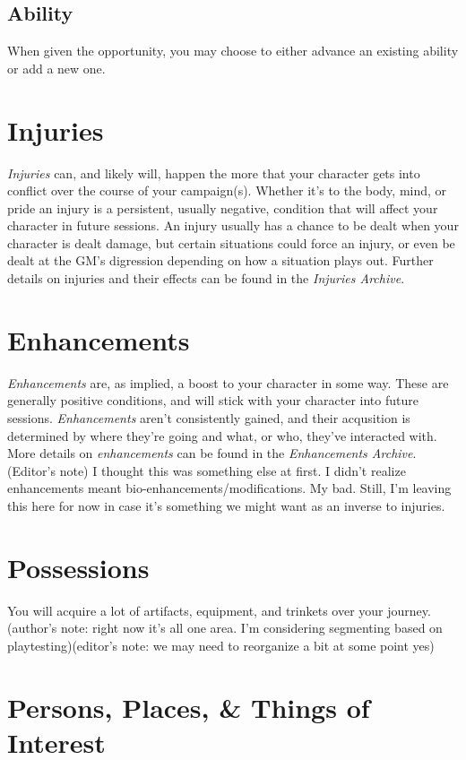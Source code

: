 \subsection{Ability \advancement}\label{subsec:adv_ability}
When given the opportunity, you may choose to either advance an existing ability or add a new one.

\section{Injuries}\label{sec:adv_injuries}
\emph{Injuries} can, and likely will, happen the more that your character gets into conflict over the course of your campaign(s). Whether it's to the body, mind, or pride an injury is a persistent, usually negative, condition that will affect your character in future sessions. An injury usually has a chance to be dealt when your character is dealt \emph{\HPful} damage, but certain situations could force an injury, or even be dealt at the GM's digression depending on how a situation plays out. Further details on injuries and their effects can be found in the \emph{Injuries Archive}.

\section{Enhancements}\label{sec:adv_enhancements}
\emph{Enhancements} are, as implied, a boost to your character in some way. These are generally positive conditions, and will stick with your character into future sessions. \emph{Enhancements} aren't consistently gained, and their acqusition is determined by where they're going and what, or who, they've interacted with. More details on \emph{enhancements} can be found in the \emph{Enhancements Archive}.
(Editor's note) I thought this was something else at first. I didn't realize enhancements meant bio-enhancements/modifications. My bad. Still, I'm leaving this here for now in case it's something we might want as an inverse to injuries.

\section{Possessions}\label{sec:possessions}
You will acquire a lot of artifacts, equipment, and trinkets over your journey. (author's note: right now it's all one area. I'm considering segmenting based on playtesting)(editor's note: we may need to reorganize a bit at some point yes)

\section{Persons, Places, \& Things of Interest}\label{sec:interests}
	